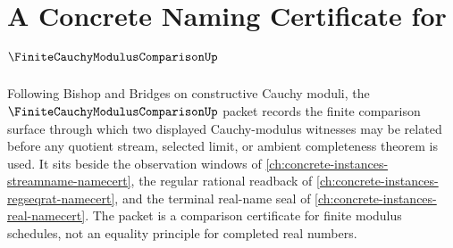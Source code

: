\chapter{A Concrete Naming Certificate for $\FiniteCauchyModulusComparisonUp$}
\label{ch:concrete-instances-finite-cauchy-modulus-comparison-namecert}

Following Bishop and Bridges on constructive Cauchy moduli, the $\FiniteCauchyModulusComparisonUp$ packet records the finite comparison surface through which two displayed Cauchy-modulus witnesses may be related before any quotient stream, selected limit, or ambient completeness theorem is used. It sits beside the observation windows of \autoref{ch:concrete-instances-streamname-namecert}, the regular rational readback of \autoref{ch:concrete-instances-regseqrat-namecert}, and the terminal real-name seal of \autoref{ch:concrete-instances-real-namecert}. The packet is a comparison certificate for finite modulus schedules, not an equality principle for completed real numbers.

